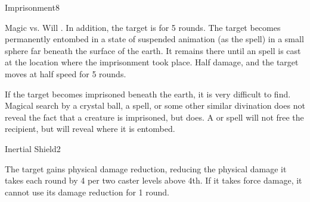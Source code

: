 \begin{spellsection}{Imprisonment}{8}
\begin{spellheader}
\end{spellheader}
\begin{spellcontent}
    \begin{spelltargetinginfo}
    \end{spelltargetinginfo}
    \begin{spelleffects}
        \begin{spellattack}{Magic vs. Will}
            \spellsuccess {}. In addition, the target is \slowed for 5 rounds.
            \spellcritical The target becomes permanently entombed in a state of suspended animation (as the  spell) in a small sphere far beneath the surface of the earth. It remains there until an  spell is cast at the location where the imprisonment took place.
            \spellfailure Half damage, and the target moves at half speed for 5 rounds.
        \end{spellattack}
    \end{spelleffects}
\end{spellcontent}
\begin{spellfooter}
    \spellnotes If the target becomes imprisoned beneath the earth, it is very difficult to find. Magical search by a crystal ball, a  spell, or some other similar divination does not reveal the fact that a creature is imprisoned, but  does. A  or  spell will not free the recipient, but will reveal where it is entombed.
\end{spellfooter}
\end{spellsection}

\begin{spellsection}{Inertial Shield}{2}
\begin{spellheader}
\end{spellheader}
\begin{spellcontent}
    \begin{spelltargetinginfo}
    \end{spelltargetinginfo}
    \begin{spelleffects}
        \spelleffect The target gains physical damage reduction, reducing the physical damage it takes each round by 4  per two caster levels above 4th. If it takes force damage, it cannot use its damage reduction for 1 round.
        \spelldur \durshort
    \end{spelleffects}
\end{spellcontent}
\begin{spellfooter}
\end{spellfooter}
\end{spellsection}

